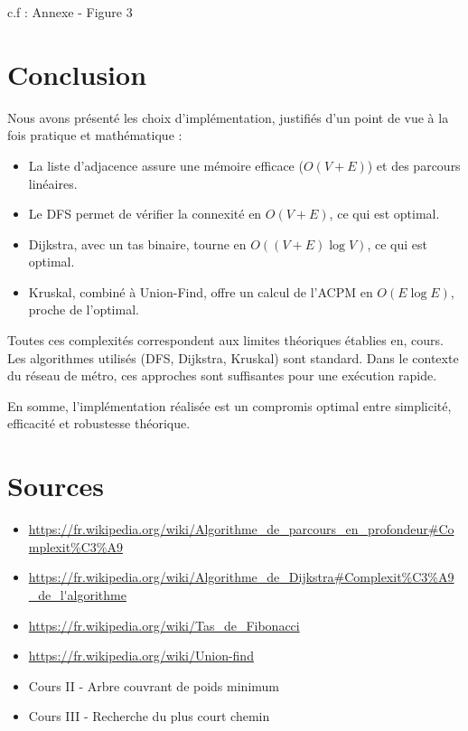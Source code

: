 \documentclass[a4paper,12pt]{article}
\begin{document}
\begin{center}
c.f : Annexe - Figure 3
\end{center}

\section{Conclusion}

Nous avons présenté les choix d’implémentation, justifiés d’un point de vue à la fois pratique et mathématique :

\begin{itemize}
    \item La liste d’adjacence assure une mémoire efficace ($O(V+E)$) et des parcours linéaires.
    \item Le DFS permet de vérifier la connexité en $O(V+E)$, ce qui est optimal.
    \item Dijkstra, avec un tas binaire, tourne en $O((V+E)\log V)$, ce qui est optimal.
    \item Kruskal, combiné à Union-Find, offre un calcul de l’ACPM en $O(E \log E)$, proche de l’optimal.
\end{itemize}

Toutes ces complexités correspondent aux limites théoriques établies en, cours. Les algorithmes utilisés (DFS, Dijkstra, Kruskal) sont standard. Dans le contexte du réseau de métro, ces approches sont suffisantes pour une exécution rapide.

En somme, l’implémentation réalisée est un compromis optimal entre simplicité, efficacité et robustesse théorique.

\newpage

\section{Sources}

\begin{itemize}
    \item \url{https://fr.wikipedia.org/wiki/Algorithme_de_parcours_en_profondeur#Complexit%C3%A9}
    \item \url{https://fr.wikipedia.org/wiki/Algorithme_de_Dijkstra#Complexit%C3%A9_de_l'algorithme}
    \item \url{https://fr.wikipedia.org/wiki/Tas_de_Fibonacci}
    \item \url{https://fr.wikipedia.org/wiki/Union-find}
    \item Cours II - Arbre couvrant de poids minimum
    \item Cours III - Recherche du plus court chemin
\end{itemize}
\end{document}
